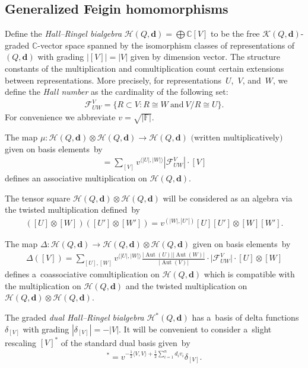 \subsection{Generalized Feigin homomorphisms}
\label{subsec:hall_gen_feigin}

Def\/ine the \emph{Hall--Ringel bialgebra} $\mathcal{H}(Q,\mathbf{d})=\bigoplus\mathbb{C}[V]$ to be the free
$\mathcal{K}(Q,\mathbf{d})$-graded $\mathbb{C}$-vector space spanned by the isomorphism classes of representations of
$(Q,\mathbf{d})$ with grading $|[V]|=|V|$ given by dimension vector.
The structure constants of the multiplication and comultiplication count certain extensions between representations.
More precisely, for representations~$U$,~$V$, and~$W$, we def\/ine the \emph{Hall number} as the cardinality of the
following set:
\begin{gather*}
\mathcal{F}_{UW}^V=\{R\subset V: R\cong W \ \text{and} \  V/R\cong U\}.
\end{gather*}
For convenience we abbreviate $v=\sqrt{|\mathbb{F}|}$.
\begin{Theorem}
The map $\mu: \mathcal{H}(Q,\mathbf{d})\otimes\mathcal{H}(Q,\mathbf{d})\to\mathcal{H}(Q,\mathbf{d})$ $($written
multiplicatively$)$ given on basis elements~by
\begin{gather*}
[U][W]=\sum\limits_{[V]}v^{\langle |U|,|W|\rangle} |\mathcal{F}_{UW}^V|\cdot[V]
\end{gather*}
defines an associative multiplication on $\mathcal{H}(Q,\mathbf{d})$.
\end{Theorem}
The tensor square $\mathcal{H}(Q,\mathbf{d})\otimes\mathcal{H}(Q,\mathbf{d})$ will be considered as an algebra via the
twisted multiplication def\/ined~by
\begin{gather*}
([U]\otimes[W])([U']\otimes[W'])=v^{(|W|,|U'|)}[U][U']\otimes[W][W'].
\end{gather*}

\begin{Theorem}\label{th:hall_comult}
The map $\Delta: \mathcal{H}(Q,\mathbf{d})\to\mathcal{H}(Q,\mathbf{d})\otimes\mathcal{H}(Q,\mathbf{d})$ given on basis
elements~by
\begin{gather*}
\Delta([V])=\sum\limits_{[U],[W]}v^{\langle |U|,|W|\rangle}
\frac{|\operatorname{Aut}(U)||\operatorname{Aut}(W)|}{|\operatorname{Aut}(V)|}\cdot\big|\mathcal{F}_{UW}^V\big|\cdot[U]\otimes[W]
\end{gather*}
defines a~coassociative comultiplication on $\mathcal{H}(Q,\mathbf{d})$ which is compatible with the multiplication on
$\mathcal{H}(Q,\mathbf{d})$ and the twisted multiplication on
$\mathcal{H}(Q,\mathbf{d})\otimes\mathcal{H}(Q,\mathbf{d})$.
\end{Theorem}

The graded \emph{dual Hall--Ringel bialgebra} $\mathcal{H}^*(Q,\mathbf{d})$ has a~basis of delta functions
$\delta_{[V]}$ with grading $|\delta_{[V]}|=-|V|$.
It will be convenient to consider a~slight rescaling $[V]^*$ of the standard dual basis given~by
\begin{gather*}
[V]^*=v^{-\frac{1}{2}\langle V,V\rangle+\frac{1}{2}\sum\limits_{i=1}^nd_iv_i}\delta_{[V]}.
\end{gather*}

